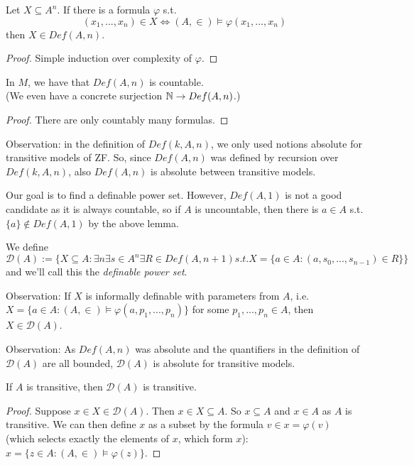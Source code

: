 \documentclass[a4paper]{article}
\begin{document}
\begin{lemma}
Let $X \subseteq A^n$. If there is a formula $\varphi$ s.t. 
\[
(x_1,...,x_n) \in X \iff (A,\in) \vDash \varphi(x_1,...,x_n)
\]
then $X \in Def(A,n)$.
\begin{proof}
Simple induction over complexity of $\varphi$.
\end{proof}
\end{lemma}

\begin{lemma}
In $M$, we have that $Def(A,n)$ is countable.\\
(We even have a concrete surjection $\mathbb{N} \to Def(A,n)$.)
\begin{proof}
There are only countably many formulas.
\end{proof}
\end{lemma}
Observation: in the definition of $Def(k,A,n)$, we only used notions absolute for transitive models of ZF. So, since $Def(A,n)$ was defined by recursion over $Def(k,A,n)$, also $Def(A,n)$ is absolute between transitive models.

Our goal is to find a definable power set. However, $Def(A,1)$ is not a good candidate as it is always countable, so if $A$ is uncountable, then there is $a \in A$ s.t. $\{a\} \not\in Def(A,1)$ by the above lemma.

We define
\[
\mathcal{D}(A) := \{X \subseteq A: \exists n \exists s \in A^n \exists R \in Def(A,n+1) s.t. X = \{a \in A: (a,s_0,...,s_{n-1}) \in R	\}\}
\]
and we'll call this the \emph{definable power set}.

Observation: If $X$ is informally definable with parameters from $A$, i.e. $X = \{ a \in A: (A,\in) \vDash \varphi(a,p_1,...,p_n) \}$ for some $p_1,...,p_n \in A$, then $X \in \mathcal{D}(A)$.

Observation: As $Def(A,n)$ was absolute and the quantifiers in the definition of $\mathcal{D}(A)$ are all bounded, $\mathcal{D}(A)$ is absolute for transitive models.

\begin{prop}
If $A$ is transitive, then $\mathcal{D}(A)$ is transitive.
\begin{proof}
Suppose $x \in X \in \mathcal{D}(A)$. Then $x \in X \subseteq A$. So $x \subseteq A$ and $x \in A$ as $A$ is transitive. We can then define $x$ as a subset by the formula $v \in x = \varphi(v)$ (which selects exactly the elements of $x$, which form $x$): $x = \{z \in A: (A,\in) \vDash \varphi(z)\}$.
\end{proof}
\end{prop}
\end{document}
